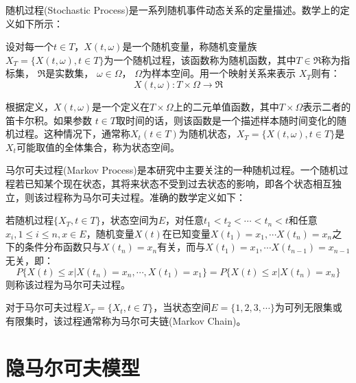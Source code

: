 随机过程(Stochastic Process)是一系列随机事件动态关系的定量描述。数学上的定义如下所示：

\begin{defn}
	设对每一个$t \in T$，$X(t,\omega)$是一个随机变量，称随机变量族 $X_T = \{X(t,\omega), t \in T\}$为一个随机过程，该函数称为随机函数，其中$T \in \Re$称为指标集， $\Re$是实数集， $\omega \in \Omega$， $\Omega$为样本空间。用一个映射关系来表示 $X_T$则有：
	\begin{equation}
		X(t,\omega):T \times \Omega \rightarrow \Re
	\end{equation}
\end{defn}

根据定义，$X(t,\omega)$是一个定义在$T \times \Omega$上的二元单值函数，其中$T \times \Omega$表示二者的笛卡尔积。如果参数 $t \in T$取时间的话，则该函数是一个描述样本随时间变化的随机过程。这种情况下，通常称$X_t (t \in T)$为随机状态，$X_T = \{X(t,\omega), t \in T\}$是$X_t$可能取值的全体集合，称为状态空间。

马尔可夫过程(Markov Process)是本研究中主要关注的一种随机过程。一个随机过程若已知某个现在状态，其将来状态不受到过去状态的影响，即各个状态相互独立，则该过程称为马尔可夫过程。准确的数学定义如下：

\begin{defn}
	若随机过程$\{X_T, t \in T\}$，状态空间为$E$，对任意$t_1 < t_2 < \cdots < t_n < t$和任意$x_i, 1 \leq i \leq n, x \in E$，随机变量$X(t)$在已知变量$X(t_1) = x_1, \cdots X(t_n) = x_n$之下的条件分布函数只与$X(t_n) = x_n$有关，而与$X(t_1) = x_1, \cdots X(t_{n-1}) = x_{n-1}$无关，即：
	\begin{equation}
		P\{X(t) \leq x | X(t_n) = x_n, \cdots , X(t_1) = x_1\} = P\{X(t) \leq x | X(t_n) = x_n\}
	\end{equation}
	则称该过程为马尔可夫过程。
\end{defn}

对于马尔可夫过程$X_T = \{X_t, t \in T \}$，当状态空间$E = \{1,2,3,\cdots\}$为可列无限集或有限集时，该过程通常称为马尔可夫链(Markov Chain)。




\section{隐马尔可夫模型}

